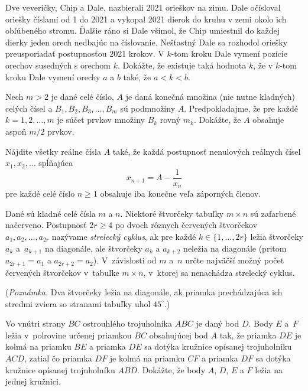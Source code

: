 {%
Dve veveričky, Chip a Dale, nazbierali 2021 orieškov na zimu. Dale očísloval oriešky
číslami od 1 do 2021 a vykopal 2021 dierok do kruhu v zemi okolo ich obľúbeného stromu. Ďalšie ráno
si Dale všimol, že Chip umiestnil do každej dierky jeden orech nedbajúc na číslovanie. Nešťastný Dale
sa rozhodol oriešky preusporiadať postupnosťou 2021 krokov. V $k$-tom kroku Dale vymení pozície
orechov susedných s orechom $k$. Dokážte, že existuje taká hodnota $k$, že v $k$-tom kroku Dale vymení
orechy $a$ a $b$ také, že $a < k < b$.}

{%
Nech $m >2$ je dané celé číslo, $A$ je daná konečná množina (nie nutne kladných) celých
čísel a $B_1, B_2, B_3, \ldots , B_m$ sú podmnožiny $A$. Predpokladajme, že pre každé $k = 1, 2, \ldots , m$ je súčet
prvkov množiny $B_k$ rovný $m_k$. Dokážte, že $A$ obsahuje aspoň $m/2$ prvkov.}

{%
Nájdite všetky reálne čísla $A$ také, že každá postupnosť nenulových reálnych čísel $x_1,x_2,\dots$ spĺňajúca
$$
x_{n+1}=A-\frac{1}{x_n}
$$
pre každé celé číslo $n\ge1$ obsahuje iba konečne veľa záporných členov.}

{%
Dané sú kladné celé čísla $m$ a $n$. Niektoré štvorčeky tabuľky $m \times n$ sú zafarbené načerveno. Postupnosť $2r \ge 4$ po dvoch rôznych červených štvorčekov $a_1, a_2, \dots, a_{2r}$ nazývame \emph{strelecký cyklus}, ak pre každé $k\in\{1,\dots, 2r\}$ ležia štvorčeky $a_k$ a~$a_{k+1}$ na diagonále, ale štvorčeky $a_k$ a $a_{k+2}$ neležia na diagonále (pritom $a_{2r+1}=a_1$ a $a_{2r+2}=a_2$). V~závislosti od $m$ a~$n$ určte najväčší možný počet červených štvorčekov v~tabuľke $m \times n$, v~ktorej sa nenachádza strelecký cyklus.

(\emph{Poznámka.} Dva štvorčeky ležia na diagonále, ak priamka prechádzajúca ich stredmi zviera so stranami tabuľky uhol $45^\circ$.)}

{%
Vo vnútri strany $BC$ ostrouhlého trojuholníka $ABC$ je daný bod $D$. Body $E$ a~$F$ ležia v~polrovine určenej priamkou $BC$ obsahujúcej bod $A$ tak, že priamka $DE$ je kolmá na priamku $BE$ a priamka $DE$ sa dotýka kružnice opísanej trojuholníku $ACD$, zatiaľ čo priamka $DF$ je kolmá na priamku $CF$ a priamka $DF$ sa dotýka kružnice opísanej trojuholníku $ABD$. Dokážte, že body $A$, $D$, $E$ a $F$ ležia na jednej kružnici.}


